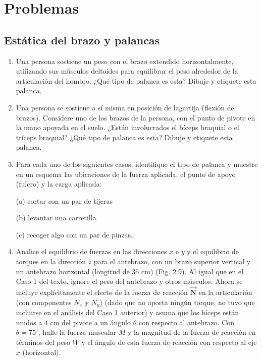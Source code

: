 \documentclass[12pt]{book}
\begin{document}
\section*{Problemas}

\subsection*{Estática del brazo y palancas}

\begin{enumerate}
\item[2.1] Una persona sostiene un peso con el brazo extendido horizontalmente, utilizando sus músculos deltoides para equilibrar el peso alrededor de la articulación del hombro. ¿Qué tipo de palanca es esta? Dibuje y etiquete esta palanca.

\item[2.2] Una persona se sostiene a sí misma en posición de lagartija (flexión de brazos). Considere uno de los brazos de la persona, con el punto de pivote en la mano apoyada en el suelo. ¿Están involucrados el bíceps braquial o el tríceps braquial? ¿Qué tipo de palanca es esta? Dibuje y etiquete esta palanca.

\item[2.3] Para cada uno de los siguientes casos, identifique el tipo de palanca y muestre en un esquema las ubicaciones de la fuerza aplicada, el punto de apoyo (fulcro) y la carga aplicada:

(a) cortar con un par de tijeras

(b) levantar una carretilla

(c) recoger algo con un par de pinzas.

\item[2.4] Analice el equilibrio de fuerzas en las direcciones $x$ e $y$ y el equilibrio de torques en la dirección $z$ para el antebrazo, con un brazo superior vertical y un antebrazo horizontal (longitud de $35\text{ cm}$) (Fig. 2.9). Al igual que en el Caso 1 del texto, ignore el peso del antebrazo y otros músculos. Ahora se incluye explícitamente el efecto de la fuerza de reacción $\vec{\mathbf{N}}$ en la articulación (con componentes $N_x$ y $N_y$) (dado que no aporta ningún torque, no tuvo que incluirse en el análisis del Caso 1 anterior) y asuma que los bíceps están unidos a $4\text{ cm}$ del pivote a un ángulo $\theta$ con respecto al antebrazo. Con $\theta = 75^\circ$, halle la fuerza muscular $M$ y la magnitud de la fuerza de reacción en términos del peso $W$ y el ángulo de esta fuerza de reacción con respecto al eje $x$ (horizontal).


\end{enumerate}
\end{document}
